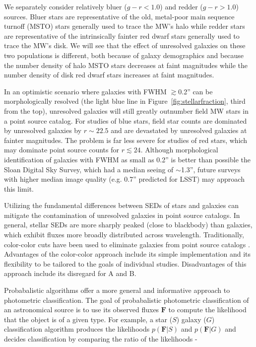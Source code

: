 \documentclass[12pt,preprint]{aastex}
\newcommand{\datavector}[1]{\boldsymbol{#1}}
\begin{document}
We separately consider relatively bluer ($g-r < 1.0$) and redder ($g-r
> 1.0$) sources.  Bluer stars are representative of the old,
metal-poor main sequence turnoff (MSTO) stars generally used to trace
the MW's halo while redder stars are representative of the
intrinsically fainter red dwarf stars generally used to trace the MW's
disk.  We will see that the effect of unresolved galaxies on these two
populations is different, both because of galaxy demographics and
because the number density of halo MSTO stars decreases at faint
magnitudes while the number density of disk red dwarf stars increases at
faint magnitudes.
 
In an optimistic scenario where galaxies with FWHM $\gtrsim$0.2'' can
be morphologically resolved (the light blue line in
Figure~\ref{fig:stellarfraction}, third from the top), unresolved
galaxies will still greatly outnumber field MW stars in a point source
catalog.  For studies of blue stars, field star counts are dominated
by unresolved galaxies by $r\sim22.5$ and are devastated by unresolved
galaxies at fainter magnitudes. The problem is far less severe for
studies of red stars, which may dominate point source counts for
$r\lesssim24$. Although morphological identification of galaxies with
FWHM as small as 0.2'' is better than possible the Sloan Digital Sky
Survey, which had a median seeing of $\sim$1.3'', future surveys with
higher median image quality (e.g. 0.7'' predicted for LSST) may
approach this limit.

Utilizing the fundamental differences between SEDs of stars and
galaxies can mitigate the contamination of unresolved galaxies in
point source catalogs.  In general, stellar SEDs are more sharply
peaked (close to blackbody) than galaxies, which exhibit fluxes more
broadly distributed across wavelength.  Traditionally, color-color
cuts have been used to eliminate galaxies from point source catalogs
\citep[e.g.][]{gould92a,reitzel98a,daddi04a}.  Advantages of the
color-color approach include its simple implementation and its
flexibility to be tailored to the goals of individual studies.
Disadvantages of this approach include its disregard for A and B.

Probabalistic algorithms offer a more general and informative approach
to photometric classification.  The goal of probabalistic photometric
classification of an astronomical source is to use its observed fluxes
$\datavector{F}$ to compute the likelihood that the object is of a
given type.  For example, a star ($S$) galaxy ($G$) classification
algorithm produces the likelihoods $p(\datavector{F}|S)$ and
$p(\datavector{F}|G)$ and decides classification by comparing the
ratio of the likelihoods -
\end{document}
